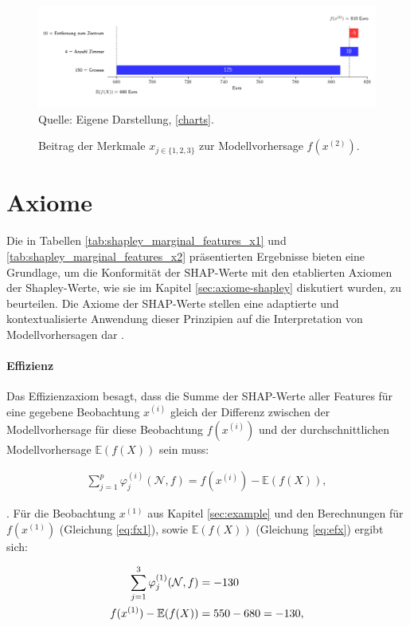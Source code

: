 \begin{figure}[h]
    \caption{Beitrag der Merkmale $x_{j \in \{1, 2, 3\}}$ zur Modellvorhersage $f(x^{(2)})$.}
    \includegraphics[width=1\textwidth]{../scripts/images/model-output-x2.png}
    Quelle: Eigene Darstellung, \ref{charts}.
    \label{pic:model-fx2}
\end{figure}


\section{Axiome}

Die in Tabellen \ref{tab:shapley_marginal_features_x1} und \ref{tab:shapley_marginal_features_x2} präsentierten Ergebnisse bieten eine Grundlage, 
um die Konformität der SHAP-Werte mit den etablierten Axiomen der Shapley-Werte, wie sie im 
Kapitel \ref{sec:axiome-shapley} diskutiert wurden, zu beurteilen. Die Axiome der SHAP-Werte stellen 
eine adaptierte und kontextualisierte Anwendung dieser Prinzipien auf die Interpretation von 
Modellvorhersagen dar \cite{NIPS2017_8a20a862}.


\paragraph{Effizienz}

Das Effizienzaxiom besagt, dass die Summe der SHAP-Werte aller Features für eine gegebene Beobachtung $x^{(i)}$ 
gleich der Differenz zwischen der Modellvorhersage für diese Beobachtung $f(x^{(i)})$ 
und der durchschnittlichen Modellvorhersage $\mathbb{E}(f(X))$ sein muss:

\begin{align}
    \sum_{j=1}^{p}\varphi_j^{(i)}(\mathcal{N}, f) = f(x^{(i)}) - \mathbb{E}(f(X)),
\end{align}

\cite[S. 221]{Molnar_2022}. Für die Beobachtung $x^{(1)}$ aus Kapitel \ref{sec:example} und den Berechnungen 
für $f(x^{(1)})$ (Gleichung \ref{eq:fx1}), sowie $\mathbb{E}(f(X))$ (Gleichung \ref{eq:efx}) ergibt sich:

\begin{align}
    \sum_{j=1}^{3}\varphi_j^{(1)}(\mathcal{N}, f) &=  -130 \\ \notag
    f(x^{(1)}) - \mathbb{E}(f(X)) &= 550 - 680 = -130,   
\end{align}

